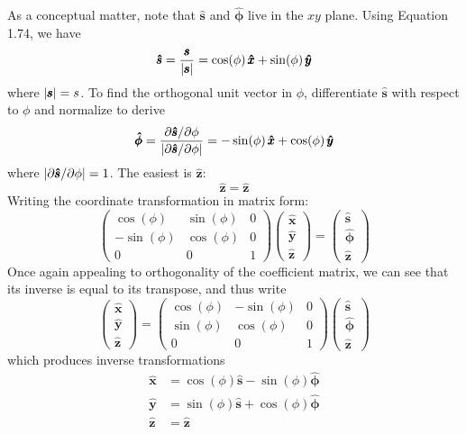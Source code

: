 \documentclass[a4paper]{article}
\begin{document}
As a conceptual matter, note that \( \pmb{\hat{s}} \) and \( \pmb{\hat{\phi}} \) live in the \( xy \) plane. Using Equation 1.74, we have 
\[
	\pmb{\hat{s}} = \frac{\pmb{s}}{\abs{\pmb{s}}} = \cos\!\left(\phi\right)\pmb{\hat{x}} + \sin\!\left(\phi\right)\pmb{\hat{y}}
\]
where \( \abs{\pmb{s}} = s \). To find the orthogonal unit vector in \( \phi \), differentiate \( \pmb{\hat{s}} \) with respect to \( \phi \) and normalize to derive
\[
	\pmb{\hat{\phi}} = \frac{\partial \pmb{\hat{s}} / \partial \phi}{\abs{\partial \pmb{\hat{s}} / \partial \phi}} = -\sin\!\left(\phi\right)\pmb{\hat{x}} + \cos\!\left(\phi\right)\pmb{\hat{y}}
\]
where \( \abs{\partial \pmb{\hat{s}} / \partial \phi} = 1 \). The easiest is \( \pmb{\hat{z}} \):
\[
	\pmb{\hat{z}} = \pmb{\hat{z}} 
\]
Writing the coordinate transformation in matrix form:
\[
	\begin{pmatrix}
		\cos\!\left(\phi\right) & \sin\!\left(\phi\right) & 0 \\
		-\sin\!\left(\phi\right) & \cos\!\left(\phi\right) & 0 \\
		0 & 0 & 1
	\end{pmatrix}
	\begin{pmatrix}
		\pmb{\hat{x}} \\
		\pmb{\hat{y}} \\
		\pmb{\hat{z}}
	\end{pmatrix}
	=
	\begin{pmatrix}
		\pmb{\hat{s}} \\
		\pmb{\hat{\phi}} \\
		\pmb{\hat{z}}
	\end{pmatrix}
\]
Once again appealing to orthogonality of the coefficient matrix, we can see that its inverse is equal to its transpose, and thus write
\[
 	\begin{pmatrix}
		\pmb{\hat{x}} \\
		\pmb{\hat{y}} \\
		\pmb{\hat{z}}
	\end{pmatrix}
	=
	\begin{pmatrix}
		\cos\!\left(\phi\right) & -\sin\!\left(\phi\right) & 0 \\
		\sin\!\left(\phi\right) & \cos\!\left(\phi\right) & 0 \\
		0 & 0 & 1
	\end{pmatrix}
	\begin{pmatrix}
		\pmb{\hat{s}} \\
		\pmb{\hat{\phi}} \\
		\pmb{\hat{z}}
	\end{pmatrix}
\]
which produces inverse transformations
\begin{align*}
	\pmb{\hat{x}} & = \cos\!\left(\phi\right)\pmb{\hat{s}} - \sin\!\left(\phi\right)\pmb{\hat{\phi}} \\
	\pmb{\hat{y}} & = \sin\!\left(\phi\right)\pmb{\hat{s}} + \cos\!\left(\phi\right)\pmb{\hat{\phi}} \\ 
	\pmb{\hat{z}} & = \pmb{\hat{z}}
\end{align*}
\end{document}
